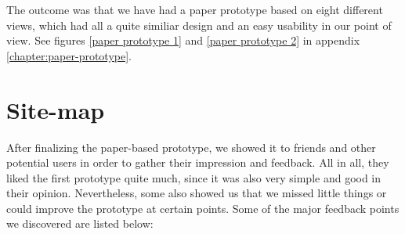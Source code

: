 \documentclass[11pt,twoside,a4paper]{report}
\begin{document}
The outcome was that we have had a paper prototype based on eight different views, which had all a quite similiar design and an easy usability in our point of view. See figures \ref{paper prototype 1} and \ref{paper prototype 2} in appendix \ref{chapter:paper-prototype}.

\section{Site-map}

After finalizing the paper-based prototype, we showed it to friends and other potential users in order to gather their impression and feedback. All in all, they liked the first prototype quite much, since it was also very simple and good in their opinion. Nevertheless, some also showed us that we missed little things or could improve the prototype at certain points. Some of the major feedback points we discovered are listed below:
\end{document}
